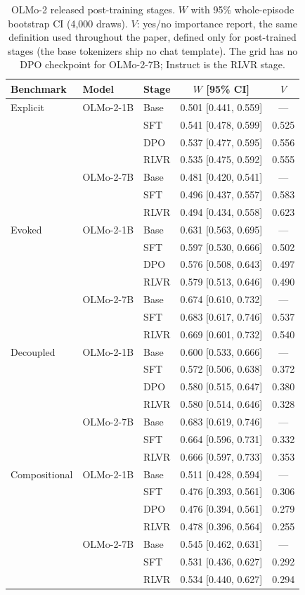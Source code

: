 \begin{table}[h]
\centering
\caption{OLMo-2 released post-training stages. $W$ with 95\% whole-episode bootstrap CI (4,000 draws). $V$: yes/no importance report, the same definition used throughout the paper, defined only for post-trained stages (the base tokenizers ship no chat template). The grid has no DPO checkpoint for OLMo-2-7B; Instruct is the RLVR stage.}
\label{tab:appA5}
\footnotesize
\setlength{\tabcolsep}{4pt}
\begin{tabular}{lllcc}
\toprule
Benchmark & Model & Stage & $W$ [95\% CI] & $V$ \\
\midrule
Explicit & OLMo-2-1B & Base & 0.501 [0.441, 0.559] & --- \\
 &  & SFT & 0.541 [0.478, 0.599] & 0.525 \\
 &  & DPO & 0.537 [0.477, 0.595] & 0.556 \\
 &  & RLVR & 0.535 [0.475, 0.592] & 0.555 \\
 & OLMo-2-7B & Base & 0.481 [0.420, 0.541] & --- \\
 &  & SFT & 0.496 [0.437, 0.557] & 0.583 \\
 &  & RLVR & 0.494 [0.434, 0.558] & 0.623 \\
\addlinespace
Evoked & OLMo-2-1B & Base & 0.631 [0.563, 0.695] & --- \\
 &  & SFT & 0.597 [0.530, 0.666] & 0.502 \\
 &  & DPO & 0.576 [0.508, 0.643] & 0.497 \\
 &  & RLVR & 0.579 [0.513, 0.646] & 0.490 \\
 & OLMo-2-7B & Base & 0.674 [0.610, 0.732] & --- \\
 &  & SFT & 0.683 [0.617, 0.746] & 0.537 \\
 &  & RLVR & 0.669 [0.601, 0.732] & 0.540 \\
\addlinespace
Decoupled & OLMo-2-1B & Base & 0.600 [0.533, 0.666] & --- \\
 &  & SFT & 0.572 [0.506, 0.638] & 0.372 \\
 &  & DPO & 0.580 [0.515, 0.647] & 0.380 \\
 &  & RLVR & 0.580 [0.514, 0.646] & 0.328 \\
 & OLMo-2-7B & Base & 0.683 [0.619, 0.746] & --- \\
 &  & SFT & 0.664 [0.596, 0.731] & 0.332 \\
 &  & RLVR & 0.666 [0.597, 0.733] & 0.353 \\
\addlinespace
Compositional & OLMo-2-1B & Base & 0.511 [0.428, 0.594] & --- \\
 &  & SFT & 0.476 [0.393, 0.561] & 0.306 \\
 &  & DPO & 0.476 [0.394, 0.561] & 0.279 \\
 &  & RLVR & 0.478 [0.396, 0.564] & 0.255 \\
 & OLMo-2-7B & Base & 0.545 [0.462, 0.631] & --- \\
 &  & SFT & 0.531 [0.436, 0.627] & 0.292 \\
 &  & RLVR & 0.534 [0.440, 0.627] & 0.294 \\
\bottomrule
\end{tabular}
\end{table}
